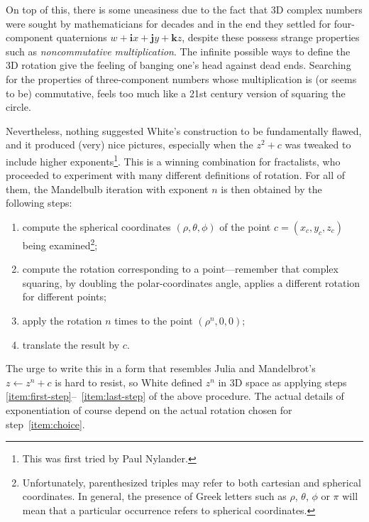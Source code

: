 \documentclass{article}
\let\vec\mathbf
\begin{document}
On top of this, there is some uneasiness due to the fact that 3D
complex numbers were sought by mathematicians for decades and in the
end they settled for four-component quaternions
$w+\vec{i}x+\vec{j}y+\vec{k}z$, despite these possess strange
properties such as \emph{noncommutative multiplication}.  The infinite
possible ways to define the 3D rotation give the feeling of banging
one's head against dead ends.  Searching for the properties of
three-component numbers whose multiplication is (or seems to be)
commutative, feels too much like a 21st century version of squaring
the circle.

Nevertheless, nothing suggested White's construction to be
fundamentally flawed, and it produced (very) nice pictures, especially
when the $z^2+c$ was tweaked to include higher exponents\footnote{This
  was first tried by Paul Nylander.}.  This is a winning combination
for fractalists, who proceeded to experiment with many different
definitions of rotation.  For all of them, the Mandelbulb iteration with
exponent $n$ is then obtained by the following steps:
\begin{enumerate}
\item \label{item:first-step} compute the spherical coordinates
  $(\rho,\theta,\phi)$ of the point $c=(x_c,y_c,z_c)$ being
  examined\footnote{Unfortunately, parenthesized triples may refer to
    both cartesian and spherical coordinates.  In general, the
    presence of Greek letters such as $\rho$, $\theta$, $\phi$ or
    $\pi$ will mean that a particular occurrence refers to spherical
    coordinates.};

\item \label{item:choice} compute the rotation corresponding to a
  point---remember that complex squaring, by doubling the
  polar-coordinates angle, applies a different rotation for different
  points;

\item \label{item:last-step}
  apply the rotation $n$ times to the point $(\rho^n,0,0)$;
\item translate the result by $c$.
\end{enumerate}

The urge to write this in a form that resembles Julia and Mandelbrot's
$z\leftarrow z^n+c$ is hard to resist, so White defined $z^n$ in 3D space as
applying steps \ref{item:first-step}--~\ref{item:last-step} of the
above procedure.  The actual details of exponentiation of course
depend on the actual rotation chosen for step~\ref{item:choice}.
\end{document}
